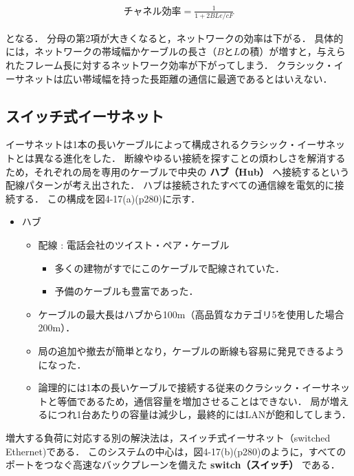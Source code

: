 \documentclass[a4paper]{ltjsarticle}
\begin{document}
\begin{align}
  \text{チャネル効率} = \frac{1}{1+2BLe/cF}
\end{align}

となる． 分母の第2項が大きくなると，ネットワークの効率は下がる．
具体的には，ネットワークの帯域幅かケーブルの長さ（\(B\)と\(L\)の積）が増すと，与えられたフレーム長に対するネットワーク効率が下がってしまう．
クラシック・イーサネットは広い帯域幅を持った長距離の通信に最適であるとはいえない．

\subsection{スイッチ式イーサネット}\label{ux30b9ux30a4ux30c3ux30c1ux5f0fux30a4ux30fcux30b5ux30cdux30c3ux30c8}

イーサネットは1本の長いケーブルによって構成されるクラシック・イーサネットとは異なる進化をした．
断線やゆるい接続を探すことの煩わしさを解消するため，それぞれの局を専用のケーブルで中央の
\textbf{ハブ（Hub）} へ接続するという配線パターンが考え出された．
ハブは接続されたすべての通信線を電気的に接続する．
この構成を図4-17(a)(p280)に示す．

\begin{itemize}
\item
  ハブ

  \begin{itemize}
  \item
    配線 : 電話会社のツイスト・ペア・ケーブル

    \begin{itemize}
    \item
      多くの建物がすでにこのケーブルで配線されていた．
    \item
      予備のケーブルも豊富であった．
    \end{itemize}
  \item
    ケーブルの最大長はハブから100m（高品質なカテゴリ5を使用した場合200m）．
  \item
    局の追加や撤去が簡単となり，ケーブルの断線も容易に発見できるようになった．
  \item
    論理的には1本の長いケーブルで接続する従来のクラシック・イーサネットと等価であるため，通信容量を増加させることはできない．
    局が増えるにつれ1台あたりの容量は減少し，最終的にはLANが飽和してしまう．
  \end{itemize}
\end{itemize}

増大する負荷に対応する別の解決法は，スイッチ式イーサネット（switched
Ethernet)である．
このシステムの中心は，図4-17(b)(p280)のように，すべてのポートをつなぐ高速なバックプレーンを備えた
\textbf{switch（スイッチ）} である．
\end{document}
